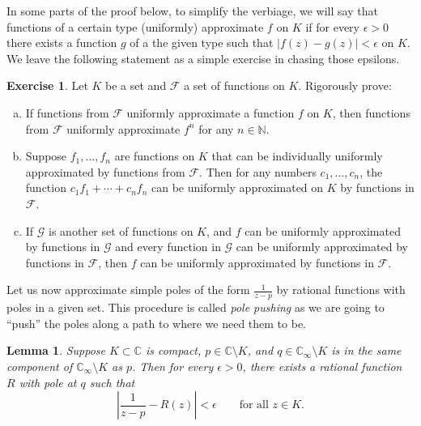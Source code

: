 \documentclass[12pt,openany]{book}
\newcommand{\sabs}[1]{\lvert {#1} \rvert}
\newcommand{\abs}[1]{\left\lvert {#1} \right\rvert}
\newcommand{\C}{{\mathbb{C}}}
\newcommand{\N}{{\mathbb{N}}}
\newcommand{\sF}{{\mathscr{F}}}
\newcommand{\sG}{{\mathscr{G}}}
\newcommand{\myindex}[1]{#1\index{#1}}
\newcommand{\myquote}[1]{``#1''}
\theoremstyle{plain}
\newtheorem{lemma}[thm]{Lemma}
\theoremstyle{remark}
\theoremstyle{definition}
\newenvironment{exbox}{%
    \def\FrameCommand{\vrule width 1pt \relax\hspace{10pt}}%
    \MakeFramed{\advance\hsize-\width\FrameRestore}%
}{%
    \endMakeFramed
}
\newenvironment{exparts}{%
    \leavevmode\begin{enumerate}[a),noitemsep,topsep=0pt,parsep=0pt,partopsep=0pt]
}{%
    \end{enumerate}
}
\theoremstyle{exercise}
\newtheorem{exercise}{Exercise}[section]
\theoremstyle{example}
\begin{document}
In some parts of the proof below, to simplify the verbiage, we will say that
functions of a certain type (uniformly) approximate $f$ on $K$
if for every $\epsilon > 0$ there exists a function $g$
of a the given type such that
$\sabs{f(z)-g(z)} < \epsilon$ on $K$.  We leave the following statement as
a simple exercise in chasing those epsilons.

\begin{exbox}
\begin{exercise} \label{exercise:approxbyfamily}
Let $K$ be a set and $\sF$ a set of functions on $K$.  Rigorously prove:
\begin{exparts}
\item
If functions from $\sF$ uniformly approximate a function $f$ on $K$,
then functions from $\sF$ uniformly approximate $f^n$ for any $n \in \N$.
\item
Suppose
$f_1,\ldots,f_n$ are functions on $K$ that can be individually
uniformly approximated
by functions from $\sF$.  Then for any numbers $c_1,\ldots,c_n$, the
function $c_1 f_1 + \cdots + c_n f_n$ can be uniformly approximated on $K$
by functions in $\sF$.
\item
If $\sG$ is another set of functions on $K$, and
$f$ can be uniformly approximated by functions in $\sG$
and every function in $\sG$ can be uniformly approximated by functions in
$\sF$, then $f$ can be uniformly approximated by functions in $\sF$.
\end{exparts}
\end{exercise}
\end{exbox}

Let us now approximate simple poles of the form $\frac{1}{z-p}$ by rational
functions with poles in a given set.  This procedure is called
\emph{\myindex{pole pushing}} as we are going to \myquote{push} the poles along a
path to where we need them to be.

\begin{lemma} \label{lemma:polepushing}
Suppose $K \subset \C$ is compact,
$p \in \C \setminus K$, and
$q \in \C_{\infty} \setminus K$ is
in the same component of $\C_{\infty} \setminus K$ as $p$.
Then for every $\epsilon > 0$,
there exists a rational function $R$ with pole at $q$ such that
\begin{equation*}
\abs{\frac{1}{z-p}-R(z)} < \epsilon \qquad \text{for all $z \in K$.}
\end{equation*}
\end{lemma}
\end{document}
